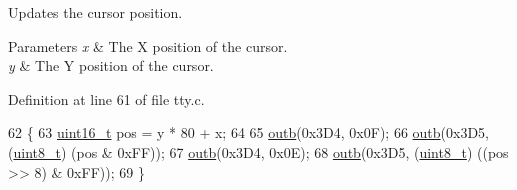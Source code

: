 Updates the cursor position. 


\begin{DoxyParams}{Parameters}
{\em x} & The X position of the cursor. \\
\hline
{\em y} & The Y position of the cursor. \\
\hline
\end{DoxyParams}


Definition at line 61 of file tty.\+c.


\begin{DoxyCode}
62 \{
63     \hyperlink{a00140_a273cf69d639a59973b6019625df33e30_a273cf69d639a59973b6019625df33e30}{uint16\_t} pos = y * 80 + x;
64  
65     \hyperlink{a00164_aa37f5841c54156a4b14fc0d6f626b44f_aa37f5841c54156a4b14fc0d6f626b44f}{outb}(0x3D4, 0x0F);
66     \hyperlink{a00164_aa37f5841c54156a4b14fc0d6f626b44f_aa37f5841c54156a4b14fc0d6f626b44f}{outb}(0x3D5, (\hyperlink{a00140_aba7bc1797add20fe3efdf37ced1182c5_aba7bc1797add20fe3efdf37ced1182c5}{uint8\_t}) (pos & 0xFF));
67     \hyperlink{a00164_aa37f5841c54156a4b14fc0d6f626b44f_aa37f5841c54156a4b14fc0d6f626b44f}{outb}(0x3D4, 0x0E);
68     \hyperlink{a00164_aa37f5841c54156a4b14fc0d6f626b44f_aa37f5841c54156a4b14fc0d6f626b44f}{outb}(0x3D5, (\hyperlink{a00140_aba7bc1797add20fe3efdf37ced1182c5_aba7bc1797add20fe3efdf37ced1182c5}{uint8\_t}) ((pos >> 8) & 0xFF));
69 \}
\end{DoxyCode}
